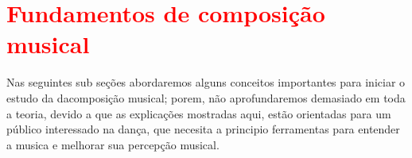 
\chapter{\textcolor{red}{Fundamentos de composição musical}}
Nas seguintes sub seções abordaremos alguns conceitos importantes para iniciar o estudo da dacomposição musical;
porem, não aprofundaremos demasiado em toda a teoria, 
devido a que as explicações mostradas aqui, estão
orientadas para um público interessado na dança, que necesita a principio
ferramentas para entender a musica e melhorar sua percepção musical. 


 
 
 
 
 


 
 
 

